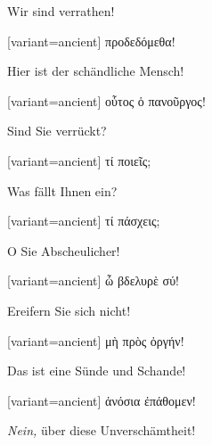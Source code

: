 Wir sind verrathen! 

\switchcolumn

\begin{greek}[variant=ancient]%
προδεδόμεθα! 

\end{greek}%
\switchcolumn*

Hier ist der schändliche Mensch! 

\switchcolumn

\begin{greek}[variant=ancient]%
οὗτος ὁ πανοῦργος!

\end{greek}%
\switchcolumn*

Sind Sie verrückt? 

\switchcolumn

\begin{greek}[variant=ancient]%
τί ποιεῖς;

\end{greek}%
\switchcolumn*

Was fällt Ihnen ein? 

\switchcolumn

\begin{greek}[variant=ancient]%
τί πάσχεις;

\end{greek}%
\switchcolumn*

O Sie Abscheulicher! 

\switchcolumn

\begin{greek}[variant=ancient]%
ὦ βδελυρὲ σύ!

\end{greek}%
\switchcolumn*

Ereifern Sie sich nicht! 

\switchcolumn

\begin{greek}[variant=ancient]%
μὴ πρὸς ὀργήν!

\end{greek}%
\switchcolumn*

Das ist eine Sünde und Schande! 

\switchcolumn

\begin{greek}[variant=ancient]%
ἀνόσια ἐπάθομεν!

\end{greek}%
\switchcolumn*

\emph{Nein,} über diese Unverschämtheit!

\switchcolumn

